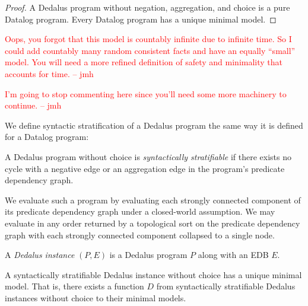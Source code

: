 \documentclass{acm_proc_article-sp-sigmod09}
\newcommand{\jmh}[1]{{\textcolor{red}{#1 -- jmh}}}
\newcommand{\wrm}[1]{{\color{BurntOrange}{#1 -- wrm}}}
\begin{document}
\begin{proof} 
%
A Dedalus program without negation, aggregation, and choice is a pure Datalog
program.  Every Datalog program has a unique minimal model. \wrm{cite?  or the
audience knows this}
%
\end{proof}

\jmh{Oops, you forgot that this model is countably infinite due to infinite time. So I could add countably many random consistent facts and have an equally ``small'' model. You will need a more refined definition of safety and minimality that accounts for time.}

\jmh{I'm going to stop commenting here since you'll need some more machinery to continue.}

We define syntactic stratification of a Dedalus program the same way it is
defined for a Datalog program:

\begin{definition}
%
A Dedalus program without choice is \emph{syntactically stratifiable} if there
exists no cycle with a negative edge or an aggregation edge in the program's
predicate dependency graph.
%
\end{definition}

We evaluate such a program by evaluating each strongly connected component of
its predicate dependency graph under a closed-world assumption.  We may
evaluate in any order returned by a topological sort on the predicate
dependency graph with each strongly connected component collapsed to a single
node. \wrm{XXX: is this right?}

\begin{definition}
%
A {\em Dedalus instance} $(P,E)$ is a Dedalus program $P$ along with an EDB
$E$.
%
\end{definition}

\begin{lemma}
%
A syntactically stratifiable Dedalus instance without choice has a unique
minimal model.  That is, there exists a function $D$ from syntactically
stratifiable Dedalus instances without choice to their minimal models.
%
\end{lemma}
\end{document}
